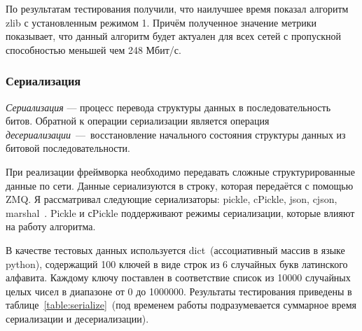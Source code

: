 \documentclass[12pt,a4paper,oneside]{extarticle}
\begin{document}
            По результатам тестирования получили, что наилучшее время показал алгоритм zlib с установленным режимом 1. Причём полученное значение метрики показывает, что данный алгоритм будет актуален для всех сетей с пропускной способностью меньшей чем 248 Мбит/с.




        \subsubsection{Сериализация}
            {\it Сериализация} — процесс перевода структуры данных в последовательность битов. Обратной к операции сериализации является операция {\it десериализации}~---~восстановление начального состояния структуры данных из битовой последовательности.

            При реализации фреймворка необходимо передавать сложные структурированные данные по сети. Данные сериализуются в строку, которая передаётся с помощью ZMQ. Я рассматривал следующие сериализаторы: pickle, cPickle, json, cjson, marshal~\cite{serialize}. Pickle и сPickle поддерживают режимы сериализации, которые влияют на работу алгоритма.

            В качестве тестовых данных используется dict~(ассоциативный массив в языке python), содержащий 100 ключей в виде строк из 6 случайных букв латинского алфавита. Каждому ключу поставлен в соответствие список из 10000 случайных целых чисел в диапазоне от 0 до 1000000. Результаты тестирования приведены в таблице~\ref{table:serialize}~(под временем работы подразумевается суммарное время сериализации и десериализации).
\end{document}
